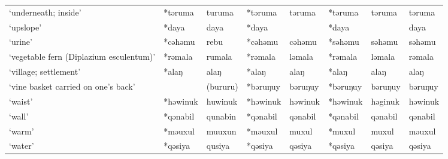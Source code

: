 \begin{landscape}
\begin{longtable}[c]{@{}p{3cm}<{\raggedright}p{2.75cm}<{\raggedright}p{2.75cm}<{\raggedright}p{2.75cm}<{\raggedright}p{2.75cm}<{\raggedright}p{2.75cm}<{\raggedright}p{2.75cm}<{\raggedright}p{2.75cm}<{\raggedright}@{}}
`underneath; inside'                                 & *təruma            & turuma                         & *təruma            & təruma                     & *təruma          & təruma                   & təruma                            \\
`upslope'                                            & *daya              & daya                           & *daya              &                            & *daya            &                          & daya                              \\
`urine'                                              & *cəhəmu            & rebu                           & *cəhəmu            & cəhəmu                     & *səhəmu          & səhəmu                   & səhəmu                            \\
`vegetable fern (Diplazium esculentum)'              & *rəmala            & rumala                         & *rəmala            & ləmala                     & *rəmala          & ləmala                   & rəmala                            \\
`village; settlement'                                & *alaŋ              & alaŋ                           & *alaŋ              & alaŋ                       & *alaŋ            & alaŋ                     & alaŋ                              \\
`vine basket carried on one's back'                  &    & (bururu)                         & *bəruŋuy           & bəruŋuy                    & *bəruŋuy         & bəruŋuy                  & bəruŋuy                           \\
`waist'                                              & *həwinuk           & huwinuk                        & *həwinuk           & həwinuk                    & *həwinuk         & həginuk                  & həwinuk                           \\
`wall'                                               & *qənabil           & qunabin                        & *qənabil           & qənabil                    & *qənabil         & qənabil                  & qənabil                           \\
`warm'                                               & *məuxul            & muuxun                         & *məuxul            & muxul                      & *muxul           & muxul                    & məuxul                            \\
`water'                                              & *qəsiya            & qusiya                         & *qəsiya            & qəsiya                     & *qəsiya          & qəsiya                   & qəsiya                            \\

\end{longtable}
\end{landscape}
